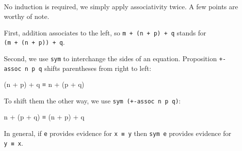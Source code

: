 \begin{fence}
\begin{code}
\AgdaSymbol{(}\AgdaSpace{}%
\AgdaSymbol{(}\AgdaSpace{}%
\AgdaSpace{}%
\AgdaSpace{}%
\AgdaSymbol{))}\AgdaSpace{}%
\<%
\\
\>[2][@{}l@{\AgdaIndent{0}}]%
\>[4]\AgdaSpace{}%
\AgdaOperator{\AgdaPrimitive{+}}\AgdaSpace{}%
\AgdaSymbol{((}\AgdaSpace{}%
\AgdaOperator{\AgdaPrimitive{+}}\AgdaSpace{}%
\AgdaSymbol{)}\AgdaSpace{}%
\AgdaOperator{\AgdaPrimitive{+}}\AgdaSpace{}%
\AgdaSymbol{)}\<%
\\
%
\>[2]\AgdaSpace{}%
\AgdaSpace{}%
\AgdaSymbol{(}\AgdaSpace{}%
\AgdaSpace{}%
\AgdaSymbol{(}\AgdaSpace{}%
\AgdaOperator{\AgdaPrimitive{+}}\AgdaSpace{}%
\AgdaSymbol{)}\AgdaSpace{}%
\AgdaSymbol{)}\AgdaSpace{}%
\<%
\\
\>[2][@{}l@{\AgdaIndent{0}}]%
\>[4]\AgdaSymbol{(}\AgdaSpace{}%
\AgdaOperator{\AgdaPrimitive{+}}\AgdaSpace{}%
\AgdaSymbol{(}\AgdaSpace{}%
\AgdaOperator{\AgdaPrimitive{+}}\AgdaSpace{}%
\AgdaSymbol{))}\AgdaSpace{}%
\AgdaOperator{\AgdaPrimitive{+}}\AgdaSpace{}%
\<%
\\
%
\>[2]\<%
\end{code}
\end{fence}

No induction is required, we simply apply associativity twice. A few
points are worthy of note.

First, addition associates to the left, so
\texttt{m\ +\ (n\ +\ p)\ +\ q} stands for
\texttt{(m\ +\ (n\ +\ p))\ +\ q}.

Second, we use \texttt{sym} to interchange the sides of an equation.
Proposition \texttt{+-assoc\ n\ p\ q} shifts parentheses from right to
left:

\begin{myDisplay}
(n + p) + q ≡ n + (p + q)
\end{myDisplay}

To shift them the other way, we use \texttt{sym\ (+-assoc\ n\ p\ q)}:

\begin{myDisplay}
n + (p + q) ≡ (n + p) + q
\end{myDisplay}

In general, if \texttt{e} provides evidence for \texttt{x\ ≡\ y} then
\texttt{sym\ e} provides evidence for \texttt{y\ ≡\ x}.

